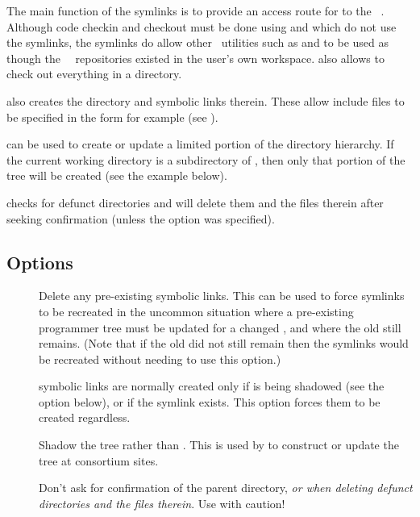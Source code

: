 The main function of the  symlinks is to provide an access route for
 to the \aipspp\ .  Although code checkin and
checkout must be done using  and  which do not use the
 symlinks, the symlinks do allow other \rcs\ utilities such as
 and  to be used as though the \aipspp\ \rcs\ 
repositories existed in the user's own workspace.   also allows
\code{ao RCS/*,v} to check out everything in a directory.

 also creates the  directory and symbolic links
therein.  These allow include files to be specified in the form
 for example (see ).

 can be used to create or update a limited portion of the
directory hierarchy.  If the current working directory is a subdirectory of
\file{*/code}, then only that portion of the tree will be created (see the
example below).

 checks for defunct directories and will delete them and the files
therein after seeking confirmation (unless the \exe{-s} option was specified).

\subsection*{Options}

\begin{description}
\item[]
   Delete any pre-existing symbolic links.  This can be used to force symlinks
   to be recreated in the uncommon situation where a pre-existing programmer
   tree must be updated for a changed , and where the old
   \file{AIPSROOT} still remains.  (Note that if the old \file{AIPSROOT} did
   not still remain then the symlinks would be recreated without needing to
   use this option.)

\item[]
    symbolic links are normally created only if  is
   being shadowed (see the \exe{-r} option below), or if the
    symlink exists.  This option forces them to be
   created regardless.

\item[]
   Shadow the  tree rather than .  This is
   used by \exeref{inhale} to construct or update the \file{\$AIPSCODE} tree
   at consortium sites.

\item[]
   Don't ask for confirmation of the parent directory, {\em or when deleting
   defunct directories and the files therein}.  Use with caution!
\end{description}


